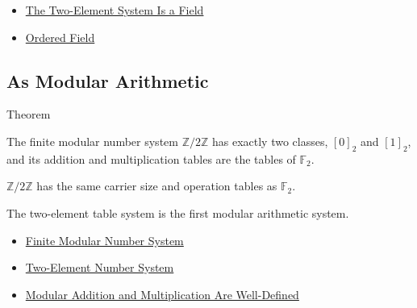 \begin{dependencies}
\begin{itemize}
  \item \hyperref[thm:two-element-system-is-field]{The Two-Element System Is a Field}
  \item \hyperref[def:abstract-ordered-field]{Ordered Field}
\end{itemize}
\end{dependencies}

\subsection*{As Modular Arithmetic}

\begin{theorembox}{Theorem}
\begin{theorem}
\label{thm:z-mod-two-is-two-element-system}
The finite modular number system \(\mathbb{Z}/2\mathbb{Z}\) has exactly two
classes, \([0]_2\) and \([1]_2\), and its addition and multiplication tables
are the tables of \(\mathbb{F}_2\).
\end{theorem}

\begin{remark*}
\(\mathbb{Z}/2\mathbb{Z}\) has the same carrier size and operation tables as
\(\mathbb{F}_2\).
\end{remark*}

\begin{remark*}[Interpretation]
The two-element table system is the first modular arithmetic system.
\end{remark*}
\end{theorembox}

\begin{dependencies}
\begin{itemize}
  \item \hyperref[def:finite-modular-number-system]{Finite Modular Number System}
  \item \hyperref[def:two-element-number-system]{Two-Element Number System}
  \item \hyperref[thm:modular-operations-well-defined]{Modular Addition and Multiplication Are Well-Defined}
\end{itemize}
\end{dependencies}
